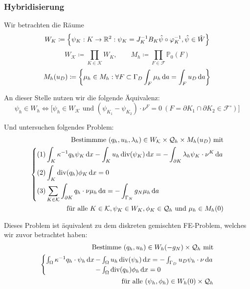 \subsubsection{Hybridisierung}

Wir betrachten die Räume
\[W_K \coloneqq \left\{ \psi_K:K \to \mathbb{R}^2: \psi_K = J_K^{-1}  B_K \hat{\psi} \circ \varphi_K^{-1}, \hat{\psi} \in \hat{W} \right\} \]
\[ W_\mathcal{K} \coloneqq \prod_{K \in \mathcal{K}} W_K, \qquad M_h \coloneqq \prod_{F \in \mathcal{F}} \mathbb{P}_0(F) \]
\[ M_h(u_D) \coloneqq \left\{ \mu_h \in M_h:\forall  F \subset \Gamma_D \int_F \mu_h \, \mathrm{d} a = \int_F u_D \, \mathrm{d} a  \right\}\]

An dieser Stelle nutzen wir die folgende Äquivalenz:\\
	\[ \psi_h \in W_h \iff \big[ \psi_h \in W_{\mathcal{K}} \text{ und }  (\psi_{K_1} - \psi_{K_2}) \cdot \nu^F = 0 \ (F= \partial K_1 \cap \partial K_2 \in \mathcal{F}^{\circ})\big] \]



Und untersuchen folgendes Problem:
\begin{align*}
\text{Bestimmme } (q_h,u_h, \lambda_h) \in W_\mathcal{K} \times \mathcal{Q}_h \times M_h(u_D) \text{ mit}\\
\begin{dcases}
(1) \int_K \kappa^{-1} q_h \psi_K \, \mathrm{d} x - \int_K u_h \operatorname{div}(\psi_K) \, \mathrm{d} x = - \int_{\partial K} \lambda_h \psi_K \cdot \nu^K \, \mathrm{d} a \\
(2) \int_K \operatorname{div}(q_h) \phi_K \, \mathrm{d} x = 0\\
(3) \sum_{K\in \mathcal{K}} \int_{\partial K} q_h \cdot \nu \mu_h \, \mathrm{d} a = - \int_{\Gamma_N} g_N \mu_h \, \mathrm{d} a
\end{dcases}\\
\text{für alle } K \in \mathcal{K}, \psi_K \in W_K, \phi_K \in \mathcal{Q}_h  \text{ und } \mu_h \in M_h(0)
\end{align*}

Dieses Problem ist äquivalent zu dem diskreten gemischten FE-Problem, welches wir zuvor betrachtet haben:
\begin{align*}
\text{Bestimme } (q_h,u_h) \in W_h(-g_N) \times \mathcal{Q}_h \text{ mit}\\
\begin{cases}
\int_{\Omega} \kappa ^{-1} q_h \cdot \psi_h \, \mathrm{d} x \mkern-15mu &- \int_{\Omega} u_h \operatorname{div}(\psi_h) \, \mathrm{d} x = - \int_{\Gamma_D} u_D \psi_h \cdot \nu \, \mathrm{d} a\\
&- \int_{\Omega} \operatorname{div}(q_h) \phi_h \, \mathrm{d} x = 0
\end{cases} \\
\text{für alle } (\psi_h, \phi_h) \in W_h(0) \times \mathcal{Q}_h
\end{align*}


